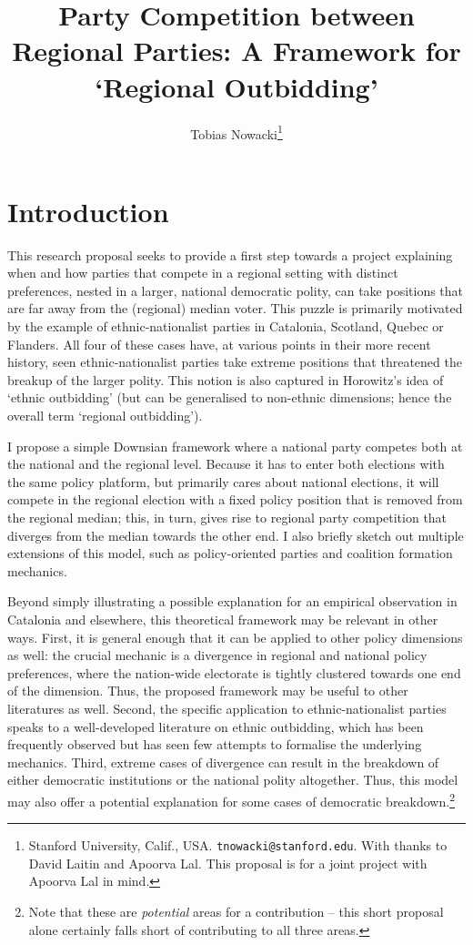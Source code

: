 \documentclass[11pt]{article}
\title{Party Competition between Regional Parties: A Framework for `Regional Outbidding'}
\author{Tobias Nowacki\thanks{Stanford University, Calif., USA. \texttt{tnowacki@stanford.edu}. With thanks to David Laitin and Apoorva Lal. This proposal is for a joint project with Apoorva Lal in mind.}}
\begin{document}
\maketitle

\onehalfspacing

\section{Introduction}

This research proposal seeks to provide a first step towards a project explaining when and how parties that compete in a regional setting with distinct preferences, nested in a larger, national democratic polity, can take positions that are far away from the (regional) median voter. This puzzle is primarily motivated by the example of ethnic-nationalist parties in Catalonia, Scotland, Quebec or Flanders. All four of these cases have, at various points in their more recent history, seen ethnic-nationalist parties take extreme positions that threatened the breakup of the larger polity. This notion is also captured in Horowitz's \parencite*[]{Horowitz2000} idea of `ethnic outbidding' (but can be generalised to non-ethnic dimensions; hence the overall term `regional outbidding'). 

I propose a simple Downsian framework where a national party competes both at the national and the regional level. Because it has to enter both elections with the same policy platform, but primarily cares about national elections, it will compete in the regional election with a fixed policy position that is removed from the regional median; this, in turn, gives rise to regional party competition that diverges from the median towards the other end. I also briefly sketch out multiple extensions of this model, such as policy-oriented parties and coalition formation mechanics.

Beyond simply illustrating a possible explanation for an empirical observation in Catalonia and elsewhere, this theoretical framework may be relevant in other ways. First, it is general enough that it can be applied to other policy dimensions as well: the crucial mechanic is a divergence in regional and national policy preferences, where the nation-wide electorate is tightly clustered towards one end of the dimension. Thus, the proposed framework may be useful to other literatures as well. Second, the specific application to ethnic-nationalist parties speaks to a well-developed literature on ethnic outbidding, which has been frequently observed but has seen few attempts to formalise the underlying mechanics. Third, extreme cases of divergence can result in the breakdown of either democratic institutions or the national polity altogether. Thus, this model may also offer a potential explanation for some cases of democratic breakdown.\footnote{Note that these are \textit{potential} areas for a contribution -- this short proposal alone certainly falls short of contributing to all three areas.}
\end{document}
